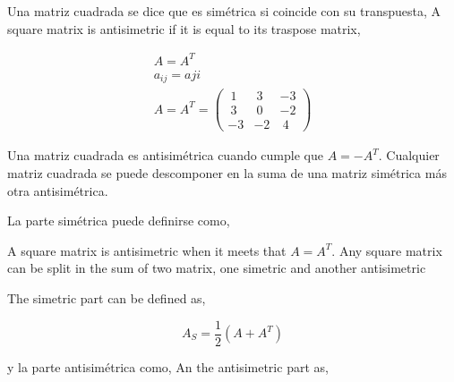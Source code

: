 \begin{paracol}{2}
Una matriz cuadrada se dice que es simétrica si coincide con su transpuesta,
\switchcolumn
A square matrix is antisimetric if it is equal to its traspose matrix,
\end{paracol}

\begin{gather*}
A=A^T\\
a_{ij}=a{ji}\\
A=A^T=
\begin{pmatrix}
\ 1&\ 3&-3\\
\ 3&\ 0&-2\\
-3&-2&\ 4
\end{pmatrix}
\end{gather*}

\begin{paracol}{2}
Una matriz cuadrada es antisimétrica cuando cumple que $A=-A^T$. Cualquier matriz cuadrada se puede descomponer en la suma de una matriz simétrica más otra antisimétrica.

La parte simétrica puede definirse como,

\switchcolumn
A square matrix is antisimetric when it meets that $A=A^T$. Any square matrix can be split in the sum of two matrix, one simetric and another antisimetric

The simetric part can be defined as,
    
\end{paracol}
\begin{equation*}
A_S=\frac{1}{2} \left( A+A^T \right)
\end{equation*}

\begin{paracol}{2}
y la parte antisimétrica como,
\switchcolumn
An the antisimetric part as,   
\end{paracol}

